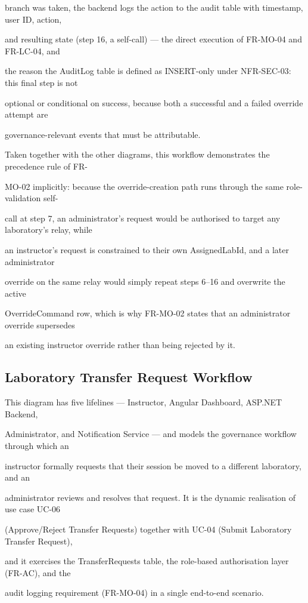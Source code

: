 branch was taken, the backend logs the action to the audit table with timestamp, user ID, action,

and resulting state (step 16, a self-call) --- the direct execution of FR-MO-04 and FR-LC-04, and

the reason the AuditLog table is defined as INSERT-only under NFR-SEC-03: this final step is not

optional or conditional on success, because both a successful and a failed override attempt are

governance-relevant events that must be attributable.

Taken together with the other diagrams, this workflow demonstrates the precedence rule of FR-

MO-02 implicitly: because the override-creation path runs through the same role-validation self-

call at step 7, an administrator's request would be authorised to target any laboratory's relay, while

an instructor's request is constrained to their own AssignedLabId, and a later administrator

override on the same relay would simply repeat steps 6--16 and overwrite the active

OverrideCommand row, which is why FR-MO-02 states that an administrator override supersedes

an existing instructor override rather than being rejected by it.


\subsection{Laboratory Transfer Request Workflow}
This diagram has five lifelines --- Instructor, Angular Dashboard, ASP.NET Backend,

Administrator, and Notification Service --- and models the governance workflow through which an

instructor formally requests that their session be moved to a different laboratory, and an

administrator reviews and resolves that request. It is the dynamic realisation of use case UC-06

(Approve/Reject Transfer Requests) together with UC-04 (Submit Laboratory Transfer Request),

and it exercises the TransferRequests table, the role-based authorisation layer (FR-AC), and the

audit logging requirement (FR-MO-04) in a single end-to-end scenario.


